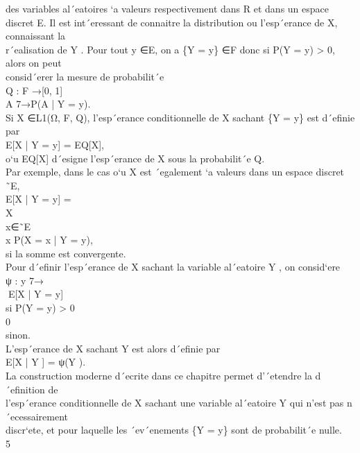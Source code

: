 \documentclass{article}
\begin{document}
des variables al´eatoires `a valeurs respectivement dans R et dans un espace \\ discret E. Il est int´eressant de connaitre la distribution ou l'esp´erance de X, connaissant la \\ r´ealisation de Y . Pour tout y ∈E, on a \{Y = y\} ∈F donc si P(Y = y) > 0, alors on peut \\ consid´erer la mesure de probabilit´e \\ Q : F →[0, 1] \\ A 7→P(A | Y = y). \\ Si X ∈L1(Ω, F, Q), l'esp´erance conditionnelle de X sachant \{Y = y\} est d´eﬁnie par \\ E[X | Y = y] = EQ[X], \\ o`u EQ[X] d´esigne l'esp´erance de X sous la probabilit´e Q. \\ Par exemple, dans le cas o`u X est ´egalement `a valeurs dans un espace discret ˜E, \\ E[X | Y = y] = \\ X \\ x∈˜E \\ x P(X = x | Y = y), \\ si la somme est convergente. \\ Pour d´eﬁnir l'esp´erance de X sachant la variable al´eatoire Y , on consid`ere \\ ψ : y 7→ \\  E[X | Y = y] \\ si P(Y = y) > 0 \\ 0 \\ sinon. \\ L'esp´erance de X sachant Y est alors d´eﬁnie par \\ E[X | Y ] = ψ(Y ). \\ La construction moderne d´ecrite dans ce chapitre permet d'´etendre la d´eﬁnition de \\ l'esp´erance conditionnelle de X sachant une variable al´eatoire Y qui n'est pas n´ecessairement \\ discr`ete, et pour laquelle les ´ev´enements \{Y = y\} sont de probabilit´e nulle. \\ 5 \\ 
\end{document}
